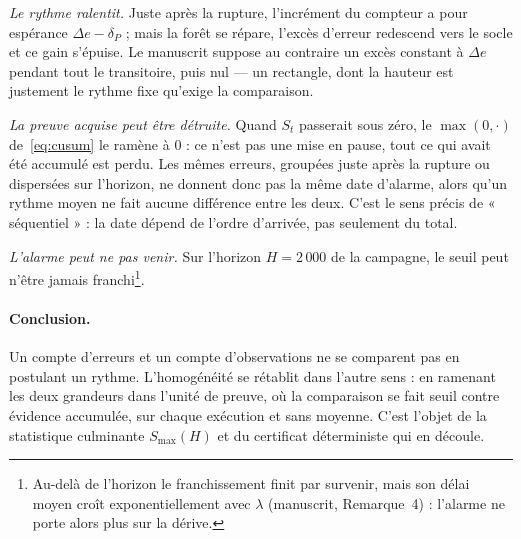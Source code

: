 \documentclass[10pt,a4paper]{article}
\begin{document}
\emph{Le rythme ralentit.} Juste après la rupture, l'incrément du compteur a pour
espérance $\Delta e - \delta_P$ ; mais la forêt se répare, l'excès d'erreur redescend
vers le socle et ce gain s'épuise. Le manuscrit suppose au contraire un excès constant à
$\Delta e$ pendant tout le transitoire, puis nul --- un rectangle, dont la hauteur est
justement le rythme fixe qu'exige la comparaison.

\emph{La preuve acquise peut être détruite.} Quand $S_t$ passerait sous zéro, le
$\max(0,\cdot)$ de~\eqref{eq:cusum} le ramène à $0$ : ce n'est pas une mise en pause,
tout ce qui avait été accumulé est perdu. Les mêmes erreurs, groupées juste après la
rupture ou dispersées sur l'horizon, ne donnent donc pas la même date d'alarme, alors
qu'un rythme moyen ne fait aucune différence entre les deux. C'est le sens précis de
« séquentiel » : la date dépend de l'ordre d'arrivée, pas seulement du total.

\emph{L'alarme peut ne pas venir.} Sur l'horizon $H = 2\,000$ de la campagne, le seuil
peut n'être jamais franchi\footnote{Au-delà de l'horizon le franchissement finit par
survenir, mais son délai moyen croît exponentiellement avec $\lambda$ (manuscrit,
Remarque~4) : l'alarme ne porte alors plus sur la dérive.}.

\paragraph{Conclusion.} Un compte d'erreurs et un compte d'observations ne se comparent
pas en postulant un rythme. L'homogénéité se rétablit dans l'autre sens : en ramenant les
deux grandeurs dans l'unité de preuve, où la comparaison se fait seuil contre évidence
accumulée, sur chaque exécution et sans moyenne. C'est l'objet de la statistique
culminante $S_{\max}(H)$ et du certificat déterministe qui en découle.

\end{document}
